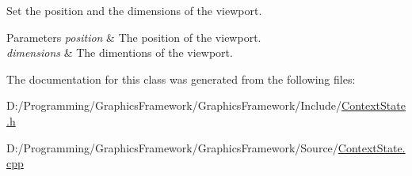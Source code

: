 Set the position and the dimensions of the viewport. 


\begin{DoxyParams}{Parameters}
{\em position} & The position of the viewport. \\
\hline
{\em dimensions} & The dimentions of the viewport. \\
\hline
\end{DoxyParams}


The documentation for this class was generated from the following files\+:\begin{DoxyCompactItemize}
\item 
D\+:/\+Programming/\+Graphics\+Framework/\+Graphics\+Framework/\+Include/\hyperlink{_context_state_8h}{Context\+State.\+h}\item 
D\+:/\+Programming/\+Graphics\+Framework/\+Graphics\+Framework/\+Source/\hyperlink{_context_state_8cpp}{Context\+State.\+cpp}\end{DoxyCompactItemize}
